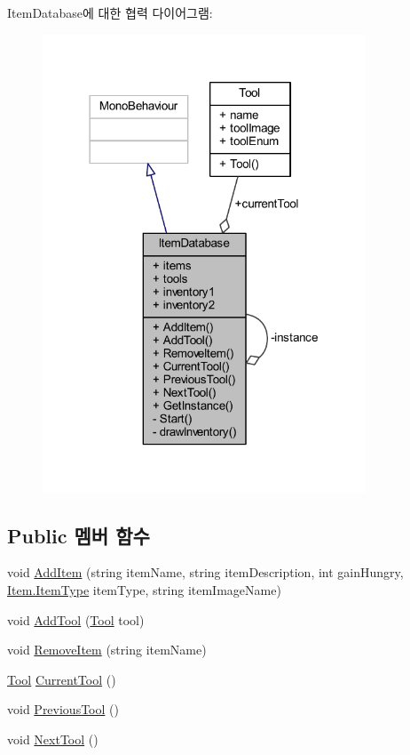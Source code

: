 Item\+Database에 대한 협력 다이어그램\+:\nopagebreak
\begin{figure}[H]
\begin{center}
\leavevmode
\includegraphics[width=273pt]{da/d81/class_item_database__coll__graph}
\end{center}
\end{figure}
\subsection*{Public 멤버 함수}
\begin{DoxyCompactItemize}
\item 
void \mbox{\hyperlink{class_item_database_a20404bd6d9530cff940b950b9a89ef4e}{Add\+Item}} (string item\+Name, string item\+Description, int gain\+Hungry, \mbox{\hyperlink{class_item_ab5eeb575e9d66ebcfef9b58b667fad05}{Item.\+Item\+Type}} item\+Type, string item\+Image\+Name)
\item 
void \mbox{\hyperlink{class_item_database_a7e3a74f7eb19ce5f1e9015945668afb3}{Add\+Tool}} (\mbox{\hyperlink{class_tool}{Tool}} tool)
\item 
void \mbox{\hyperlink{class_item_database_a86349d3b40c7195b530638ffd0d5d958}{Remove\+Item}} (string item\+Name)
\item 
\mbox{\hyperlink{class_tool}{Tool}} \mbox{\hyperlink{class_item_database_a972de3b38a572cf25163d0834c68430c}{Current\+Tool}} ()
\item 
void \mbox{\hyperlink{class_item_database_aa47d8d6f06cb4aff0254dca75e48ec48}{Previous\+Tool}} ()
\item 
void \mbox{\hyperlink{class_item_database_a2b0614a3fd6d0fa04b8a378156c66525}{Next\+Tool}} ()
\end{DoxyCompactItemize}
